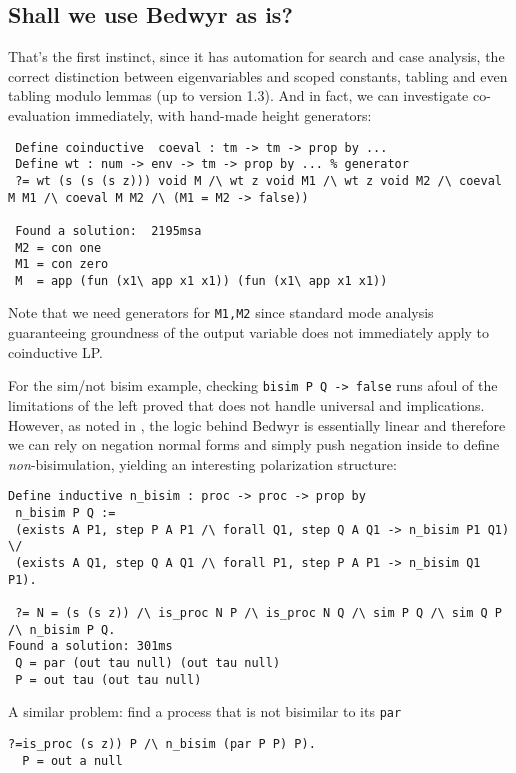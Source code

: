 \documentclass[sigconf]{acmart}
\begin{document}
\subsection{Shall we use Bedwyr as is?}
\label{sec:bed}


That's the first instinct, since it has automation for search and case analysis, the correct distinction
between eigenvariables and scoped constants, tabling and even tabling modulo lemmas (up to version 1.3). And in fact,  we
can investigate co-evaluation immediately, with hand-made height generators:
\begin{lstlisting}
 Define coinductive  coeval : tm -> tm -> prop by ...
 Define wt : num -> env -> tm -> prop by ... % generator
 ?= wt (s (s (s z))) void M /\ wt z void M1 /\ wt z void M2 /\ coeval M M1 /\ coeval M M2 /\ (M1 = M2 -> false))

 Found a solution:  2195msa
 M2 = con one
 M1 = con zero
 M  = app (fun (x1\ app x1 x1)) (fun (x1\ app x1 x1))
\end{lstlisting}
Note that we need generators for \texttt{M1,M2} since standard mode
analysis guaranteeing groundness of the output variable does not
immediately apply to coinductive LP.

For the sim/not bisim example, checking \texttt{bisim P Q -> false}
runs afoul of the limitations of the left proved that does not handle
universal and implications.  However, as noted in \cite{HeathM15}, the
logic behind Bedwyr is essentially linear and therefore we can rely on
negation normal forms and simply push negation inside to define
\emph{non}-bisimulation, yielding an interesting polarization
structure:

\begin{lstlisting}
Define inductive n_bisim : proc -> proc -> prop by
 n_bisim P Q :=
 (exists A P1, step P A P1 /\ forall Q1, step Q A Q1 -> n_bisim P1 Q1) \/
 (exists A Q1, step Q A Q1 /\ forall P1, step P A P1 -> n_bisim Q1 P1).

 ?= N = (s (s z)) /\ is_proc N P /\ is_proc N Q /\ sim P Q /\ sim Q P /\ n_bisim P Q.
Found a solution: 301ms
 Q = par (out tau null) (out tau null)
 P = out tau (out tau null)
\end{lstlisting}

A similar problem: find a process that is not bisimilar to its \texttt{par}

\begin{lstlisting}
?=is_proc (s z)) P /\ n_bisim (par P P) P).
  P = out a null
\end{lstlisting}
\end{document}
